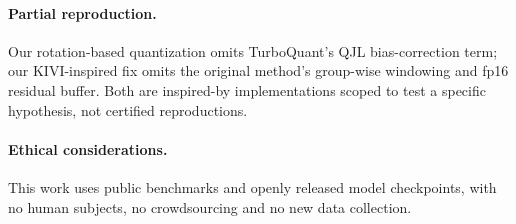 \documentclass[11pt]{article}
\begin{document}
\paragraph{Partial reproduction.} Our rotation-based quantization omits
TurboQuant's QJL bias-correction term; our KIVI-inspired fix omits the
original method's group-wise windowing and fp16 residual buffer. Both
are inspired-by implementations scoped to test a specific hypothesis,
not certified reproductions.

\paragraph{Ethical considerations.} This work uses public benchmarks and openly
released model checkpoints, with no human subjects, no crowdsourcing and no new
data collection.
\end{document}
